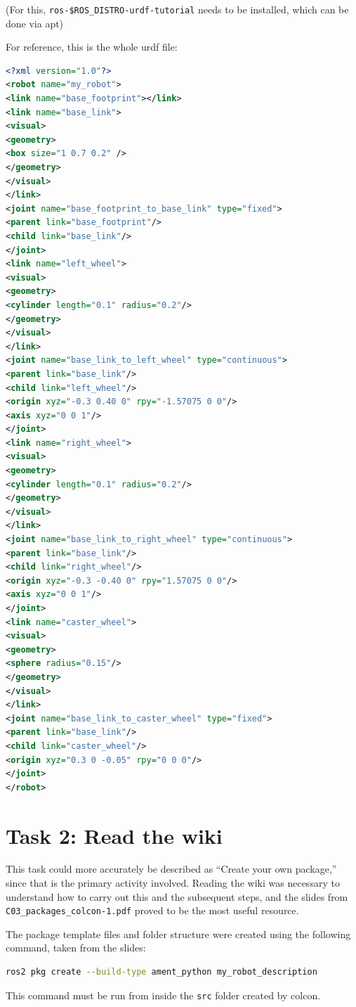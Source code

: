 \documentclass[10pt,a4paper]{article}
\begin{document}
(For this, \texttt{ros-\$ROS\_DISTRO-urdf-tutorial} needs to be installed, which can be done via apt)

For reference, this is the whole urdf file:

\begin{lstlisting}[language=XML, basicstyle=\ttfamily\small, breaklines=true]
<?xml version="1.0"?>
<robot name="my_robot">
<link name="base_footprint"></link>
<link name="base_link">
<visual>
<geometry>
<box size="1 0.7 0.2" />
</geometry>
</visual>
</link>
<joint name="base_footprint_to_base_link" type="fixed">
<parent link="base_footprint"/>
<child link="base_link"/>
</joint>
<link name="left_wheel">
<visual>
<geometry>
<cylinder length="0.1" radius="0.2"/>
</geometry>
</visual>
</link>
<joint name="base_link_to_left_wheel" type="continuous">
<parent link="base_link"/>
<child link="left_wheel"/>
<origin xyz="-0.3 0.40 0" rpy="-1.57075 0 0"/>
<axis xyz="0 0 1"/>
</joint>
<link name="right_wheel">
<visual>
<geometry>
<cylinder length="0.1" radius="0.2"/>
</geometry>
</visual>
</link>
<joint name="base_link_to_right_wheel" type="continuous">
<parent link="base_link"/>
<child link="right_wheel"/>
<origin xyz="-0.3 -0.40 0" rpy="1.57075 0 0"/>
<axis xyz="0 0 1"/>
</joint>
<link name="caster_wheel">
<visual>
<geometry>
<sphere radius="0.15"/>
</geometry>
</visual>
</link>
<joint name="base_link_to_caster_wheel" type="fixed">
<parent link="base_link"/>
<child link="caster_wheel"/>
<origin xyz="0.3 0 -0.05" rpy="0 0 0"/>
</joint>
</robot>
\end{lstlisting}

\section{Task 2: Read the wiki}

This task could more accurately be described as ``Create your own package,'' since that is the primary activity involved. Reading the wiki was necessary to understand how to carry out this and the subsequent steps, and the slides from \texttt{C03\_packages\_colcon-1.pdf} proved to be the most useful resource.

The package template files and folder structure were created using the following command, taken from the slides:
\begin{lstlisting}[language=bash]
ros2 pkg create --build-type ament_python my_robot_description
\end{lstlisting}
This command must be run from inside the \texttt{src} folder created by colcon.
\end{document}
